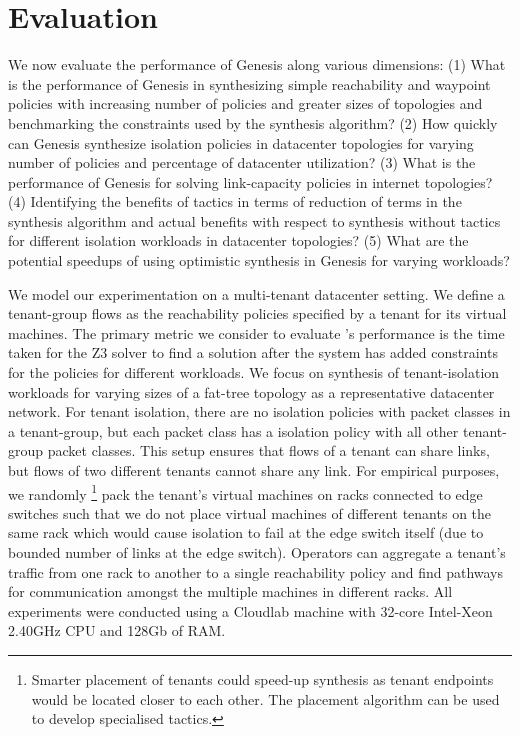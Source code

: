 \section{Evaluation}
We now evaluate the performance of Genesis along various dimensions:
 (1) What is the performance of Genesis in synthesizing simple reachability and waypoint policies
  with increasing number of policies and greater sizes of topologies and benchmarking the constraints used by the synthesis algorithm? 
  (2) How quickly can Genesis synthesize isolation policies in datacenter topologies for varying number of policies and percentage of
   datacenter utilization? 
   (3) What is the performance of Genesis for solving link-capacity policies in internet topologies? 
   (4) Identifying the benefits of tactics in terms of reduction of terms in the synthesis algorithm and actual benefits 
   with respect to synthesis without tactics for different isolation workloads in datacenter topologies? 
   (5) What are the potential speedups of using optimistic synthesis in Genesis for varying workloads? 

We model our experimentation on a multi-tenant datacenter setting. We 
define a tenant-group flows as the reachability policies specified by a tenant
for its virtual machines. The primary metric we consider to evaluate \Name's 
performance is the time taken for the Z3 solver to find a solution after 
the system has added constraints for the policies for different workloads. 
We focus on synthesis of tenant-isolation
workloads for varying sizes of a fat-tree 
topology as a representative datacenter network. For tenant isolation, there are
no isolation policies with packet classes in a tenant-group, but each packet class
has a isolation policy with all other tenant-group packet classes. This setup ensures
that flows of a tenant can share links, but flows of two different tenants cannot share
any link. 
For empirical purposes, 
we randomly
\footnote{Smarter placement of tenants could speed-up synthesis as tenant endpoints would
	be located closer to each other. The placement algorithm can be used to develop specialised tactics.}
  pack the tenant's virtual machines on racks connected to edge switches such that
   we do not place virtual machines of different tenants on the same rack which would 
   cause isolation to fail at the edge switch itself (due to bounded number of links at
   the edge switch). Operators can aggregate a tenant's traffic from one rack to
another to a single reachability policy and find pathways for communication amongst the multiple
machines in different racks. 
All experiments were conducted using a Cloudlab machine with 32-core Intel-Xeon 2.40GHz CPU and 128Gb of RAM. 
